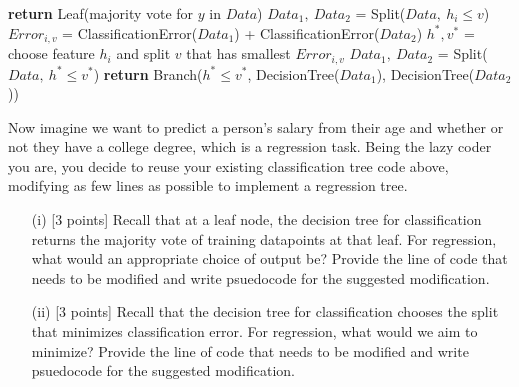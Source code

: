 \item {} 
	\vspace{0.2in}
\begin{algorithmic}[1]
            \State \textbf{return} Leaf(majority vote for $y$ in $Data$)
        \Else
                    \State $Data_1,\ Data_2$ = Split($Data,\ h_i \leq v$)
                    \State $Error_{i, v}$ = ClassificationError($Data_1$) + ClassificationError($Data_2$)
                \EndFor
            \EndFor
            \State $h^*, v^*$ = choose feature $h_i$ and split $v$ that has smallest $Error_{i, v}$
            \State $Data_1,\ Data_2$ = Split($Data,\ h^* \leq v^*$)
            \State \textbf{return} Branch($h^* \leq v^*$, DecisionTree($Data_1$), DecisionTree($Data_2$))
        \EndIf
    \EndFunction
\end{algorithmic}
	
Now imagine we want to predict a person’s salary from their age and whether or not they have a college degree, which is a regression task.  Being the lazy coder you are, you decide to reuse your existing classification tree code above, modifying as few lines as possible to implement a regression tree.
\begin{enumerate}
	\item[(i)] [3 points] Recall that at a leaf node, the decision tree for classification returns the majority vote of training datapoints at that leaf.  For regression, what would an appropriate choice of output be?  Provide the line of code that needs to be modified and write psuedocode for the suggested modification.
	\item[(ii)] [3 points] Recall that the decision tree for classification chooses the split that minimizes classification error. For regression, what would we aim to minimize?  Provide the line of code that needs to be modified and write psuedocode for the suggested modification.
\end{enumerate}